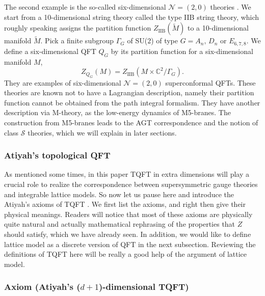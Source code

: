 The second example is the so-called six-dimensional $\mathcal{N}=\left(2,0\right)$
theories \cite{Witten:1995zh}. We start from a 10-dimensional string theory called the
type IIB string theory, which roughly speaking assigns the partition
function $Z_{\mathrm{IIB}}(\tilde{M})$ to a 10-dimensional
manifold $\tilde{M}$. Pick a finite subgroup $\Gamma_{G}$ of SU($2$)
of type $G=A_{n},\,D_{n}$ or $E_{6,7,8}$. We define a six-dimensional
QFT $Q_{G}$ by its partition function for a six-dimensional manifold
$M$,
\begin{equation}
Z_{Q_{G}}\left(M\right)  =  Z_{\mathrm{IIB}}\left(M\times\mathbb{C}^{2}/\Gamma_{G}\right).
\end{equation}
 They are examples of six-dimensional $\mathcal{N}=\left(2,0\right)$
superconformal QFTs. These theories are known not to have a Lagrangian
description, namely their partition function cannot be obtained from
the path integral formalism. They have another description via M-theory,
as the low-energy dynamics of M5-branes. The construction from M5-branes
leads to the AGT correspondence and the notion of class $\mathcal{S}$
theories, which we will explain in later sections.






\subsubsection{Atiyah's topological QFT}

As mentioned some times, in this paper TQFT in extra dimensions will
play a crucial role to realize the correspondence between supersymmetric
gauge theories and integrable lattice models. So now let us pause
here and introduce the Atiyah's axioms of TQFT \cite{Atiyah:1989vu}. We first list the
axioms, and right then give their physical meanings. Readers will
notice that most of these axioms are physically quite natural and
actually mathematical rephrasing of the properties that $Z$ should
satisfy, which we have already seen. In addition, we would like to
define lattice model as a discrete version of QFT in the next subsection.
Reviewing the definitions of TQFT here will be really a good help
of the argument of lattice model.

\subsubsection*{Axiom (Atiyah's ($d+1$)-dimensional TQFT)}

